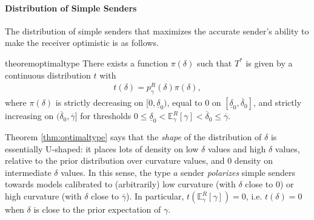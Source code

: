\documentclass[11pt,dvipsnames]{article}
\begin{document}
\paragraph{Distribution of Simple Senders}
The distribution of simple senders that maximizes the accurate sender's ability to make the receiver optimistic is as follows.
\begin{restatable}{theorem}{optimaltype}
There exists a function $\pi(\delta)$ such that $T^*$ is given by a continuous distribution $t$ with
\begin{align}
t(\delta) = p_\gamma^R(\delta)\pi(\delta),
\tag{$T^*$}
\label{eq:optimalT}	
\end{align}
where $\pi(\delta)$ is strictly decreasing on $[0,\underline{\delta}_0)$, equal to $0$ on $[\underline{\delta}_0,\overline{\delta}_0]$, and strictly increasing on $(\overline{\delta}_0,\overline{\gamma}]$ for thresholds $0 \leq \underline{\delta}_0<\mathbb{E}_\gamma^R[\gamma]<\overline{\delta}_0\leq\overline{\gamma}$.
\label{thm:optimaltype}
\end{restatable}

Theorem \ref{thm:optimaltype} says that the \emph{shape} of the distribution of $\delta$ is essentially U-shaped: it places lots of density on low $\delta$ values and high $\delta$ values, relative to the prior distribution over curvature values, and $0$ density on intermediate $\delta$ values.
In this sense, the type $a$ sender \emph{polarizes} simple senders towards models calibrated to (arbitrarily) low curvature (with $\delta$ close to $0$) or high curvature (with $\delta$ close to $\overline{\gamma}$).
In particular, $t(\mathbb{E}_\gamma^R[\gamma]) = 0$, i.e. $t(\delta) = 0$ when $\delta$ is close to the prior expectation of $\gamma$.
\end{document}
